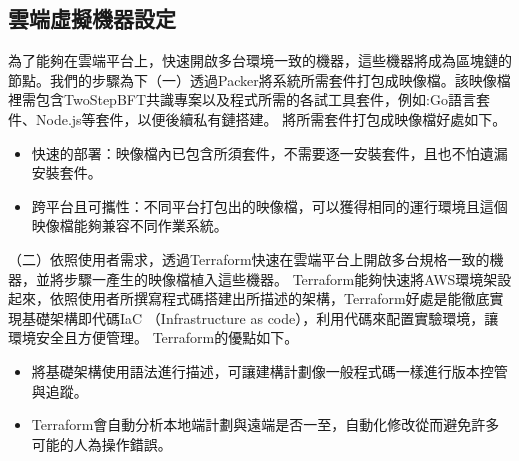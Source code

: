 \subsection{雲端虛擬機器設定}\label{se_5} 
為了能夠在雲端平台上，快速開啟多台環境一致的機器，這些機器將成為區塊鏈的節點。我們的步驟為下（一）透過Packer將系統所需套件打包成映像檔。該映像檔裡需包含TwoStepBFT共識專案以及程式所需的各試工具套件，例如:Go語言套件、Node.js等套件，以便後續私有鏈搭建。
將所需套件打包成映像檔好處如下。
\begin{itemize}%

\item 快速的部署：映像檔內已包含所須套件，不需要逐一安裝套件，且也不怕遺漏安裝套件。

\item 跨平台且可攜性：不同平台打包出的映像檔，可以獲得相同的運行環境且這個映像檔能夠兼容不同作業系統。
\end{itemize}

（二）依照使用者需求，透過Terraform快速在雲端平台上開啟多台規格一致的機器，並將步驟一產生的映像檔植入這些機器。
Terraform能夠快速將AWS環境架設起來，依照使用者所撰寫程式碼搭建出所描述的架構，Terraform好處是能徹底實現基礎架構即代碼IaC （Infrastructure as code），利用代碼來配置實驗環境，讓環境安全且方便管理。
Terraform的優點如下。
\begin{itemize}%

\item 將基礎架構使用語法進行描述，可讓建構計劃像一般程式碼一樣進行版本控管與追蹤。 

\item Terraform會自動分析本地端計劃與遠端是否一至，自動化修改從而避免許多可能的人為操作錯誤。
\end{itemize}

